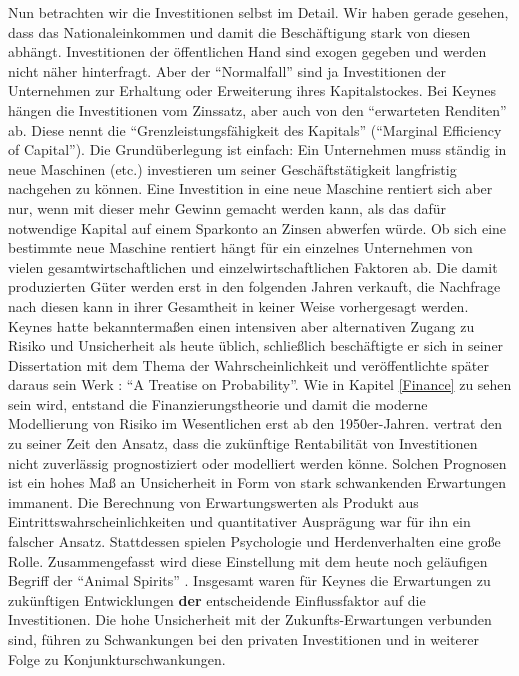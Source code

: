 Nun betrachten wir die Investitionen selbst im Detail. Wir haben gerade gesehen, dass das Nationaleinkommen und damit die Beschäftigung stark von diesen abhängt. Investitionen der öffentlichen Hand sind exogen gegeben und werden nicht näher hinterfragt. Aber der "`Normalfall"' sind ja Investitionen der Unternehmen zur Erhaltung oder Erweiterung ihres Kapitalstockes. Bei Keynes hängen die Investitionen vom Zinssatz, aber auch von den "`erwarteten Renditen"' ab. Diese nennt \textcite[S. 135]{Keynes1936} die "`Grenzleistungsfähigkeit des Kapitals"' ("`Marginal Efficiency of Capital"'). Die Grundüberlegung ist einfach: Ein Unternehmen muss ständig in neue Maschinen (etc.) investieren um seiner Geschäftstätigkeit langfristig nachgehen zu können. Eine Investition in eine neue Maschine rentiert sich aber nur, wenn mit dieser mehr Gewinn gemacht werden kann, als das dafür notwendige Kapital auf einem Sparkonto an Zinsen abwerfen würde. Ob sich eine bestimmte neue Maschine rentiert hängt für ein einzelnes Unternehmen von vielen gesamtwirtschaftlichen und einzelwirtschaftlichen Faktoren ab. Die damit produzierten Güter werden erst in den folgenden Jahren verkauft, die Nachfrage nach diesen kann in ihrer Gesamtheit in keiner Weise vorhergesagt werden. Keynes hatte bekanntermaßen einen intensiven aber alternativen Zugang zu Risiko und Unsicherheit als heute üblich, schließlich beschäftigte er sich in seiner Dissertation mit dem Thema der Wahrscheinlichkeit und veröffentlichte später daraus sein Werk \textcite{Keynes1921}: "`A Treatise on Probability"'. Wie in Kapitel \ref{Finance} zu sehen sein wird, entstand die Finanzierungstheorie und damit die moderne Modellierung von Risiko im Wesentlichen erst ab den 1950er-Jahren. \textcite{Keynes1936} vertrat den zu seiner Zeit den Ansatz, dass die zukünftige Rentabilität von Investitionen nicht zuverlässig prognostiziert oder modelliert werden könne. Solchen Prognosen ist ein hohes Maß an Unsicherheit in Form von stark schwankenden Erwartungen immanent. Die Berechnung von Erwartungswerten als Produkt aus Eintrittswahrscheinlichkeiten und quantitativer Ausprägung war für ihn ein falscher Ansatz. Stattdessen spielen Psychologie und Herdenverhalten eine große Rolle. Zusammengefasst wird diese Einstellung mit dem heute noch geläufigen Begriff der "`Animal Spirits"' \parencite[S. 161f]{Keynes1936}. Insgesamt waren für Keynes die Erwartungen zu zukünftigen Entwicklungen \textbf{der} entscheidende Einflussfaktor auf die Investitionen. Die hohe Unsicherheit mit der Zukunfts-Erwartungen verbunden sind, führen zu Schwankungen bei den privaten Investitionen und in weiterer Folge zu Konjunkturschwankungen. 

